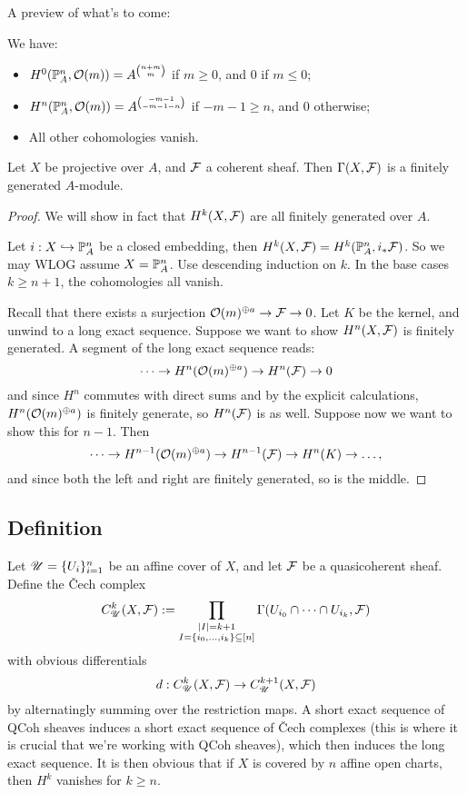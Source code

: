 \documentclass[11pt]{amsart}
\begin{document}
A preview of what's to come:


\begin{thm}[cohomologies of $\cO(m)$]
    We have:
    \begin{itemize}
        \item $H^0(\mathbb{P}^n_A, \mathcal{O}(m)) = A^{\binom{n+m}{m}}$ if $m\ge 0$, and 0 if $m\le 0$;
        \item $H^n(\mathbb{P}^n_A, \mathcal{O}(m)) = A^{\binom{-m-1}{-m-1-n}}$ if $-m-1\ge n$, and 0 otherwise;
        \item All other cohomologies vanish.
    \end{itemize}
\end{thm}

\begin{thm}
    Let $X$ be projective over $A$, and $\mathcal{F}$ a coherent sheaf. Then $\Gamma(X,\mathcal{F})$ is a finitely generated $A$-module.
\end{thm}

\begin{proof}
    We will show in fact that $H^k(X, \mathcal{F})$ are all finitely generated over $A$.

    Let $i: X\hookrightarrow \mathbb{P}^n_A$ be a closed embedding, then $H^k(X, \mathcal{F}) = H^k(\mathbb{P}^n_A, i_\ast \mathcal{F})$. So we may WLOG assume $X = \mathbb{P}^n_A$. Use descending induction on $k$. In the base cases $k\ge n+1$, the cohomologies all vanish.

    Recall that there exists a surjection $\mathcal{O}(m)^{\oplus a} \to \mathcal{F}\to 0$. Let $K$ be the kernel, and unwind to a long exact sequence. Suppose we want to show $H^n(X, \mathcal{F})$ is finitely generated. A segment of the long exact sequence reads:
    \[\dots \to H^n(\mathcal{O}(m)^{\oplus a}) \to H^n(\mathcal{F}) \to 0\]
    and since $H^n$ commutes with direct sums and by the explicit calculations, $H^n(\mathcal{O}(m)^{\oplus a})$ is finitely generate, so $H^n(\mathcal{F})$ is as well. Suppose now we want to show this for $n-1$. Then
    \[\dots \to H^{n-1}(\mathcal{O}(m)^{\oplus a}) \to H^{n-1}(\mathcal{F}) \to H^n(K) \to \dots,\]
    and since both the left and right are finitely generated, so is the middle.
\end{proof}


\subsection{Definition}

Let $\mathscr{U} = \{U_i\}_{i=1}^n$ be an affine cover of $X$, and let $\mathcal{F}$ be a quasicoherent sheaf. Define the \v{C}ech complex
\[C^k_{\mathscr{U}}(X, \mathcal{F}) := \prod_{\substack{|I| = k+1 \\ I = \{i_0,\dots,i_k\} \subseteq [n]}} \Gamma(U_{i_0}\cap\dots\cap U_{i_k}, \mathcal{F})\]
with obvious differentials
\[d: C^k_{\mathscr{U}}(X, \mathcal{F}) \to C^{k+1}_{\mathscr{U}}(X, \mathcal{F})\]
by alternatingly summing over the restriction maps. A short exact sequence of QCoh sheaves induces a short exact sequence of \v{C}ech complexes (this is where it is crucial that we're working with QCoh sheaves), which then induces the long exact sequence. It is then obvious that if $X$ is covered by $n$ affine open charts, then $H^k$ vanishes for $k\ge n$.
\end{document}
